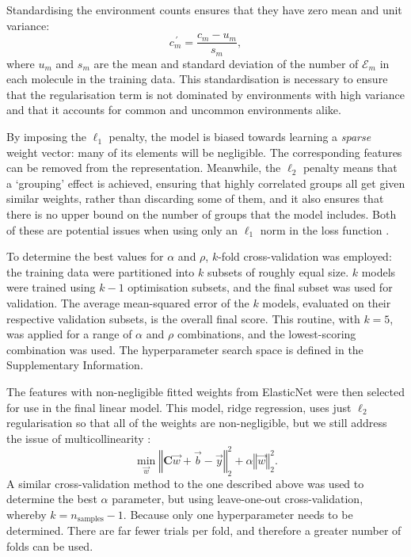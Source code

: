 Standardising the environment counts ensures that they have zero mean and unit variance:
\begin{equation}
    \label{eq:standard-scaling}
    {c}^{\,\prime}_m = \frac{c_m - u_m}{s_m},
\end{equation}
where $u_m$ and $s_m$ are the mean and standard deviation of the number of $\mathcal{E}_m$ in each molecule in the training data. This standardisation is necessary to ensure that the regularisation term is not dominated by
environments with high variance and that it accounts for common and uncommon environments alike.

By imposing the $\ell_1$ penalty, the model is biased towards learning a
\emph{sparse} weight vector: many of its elements will be negligible. The
corresponding features can be removed from the representation. Meanwhile, the
$\ell_2$ penalty means that a `grouping' effect is achieved, ensuring that
highly correlated groups all get given similar weights, rather than discarding
some of them, and it also ensures that there is no upper bound on the number of
groups that the model includes. Both of these are potential issues when using
only an $\ell_1$ norm in the loss function
\cite{efronLeastAngleRegression2004,zouRegularizationVariableSelection2005}.


To determine the best values for $\alpha$ and $\rho$, $k$-fold cross-validation was employed: the training data were partitioned into $k$ subsets of roughly equal size. $k$ models were trained using $k-1$ optimisation subsets, and the final subset was used for
validation. The average mean-squared error of the $k$ models, evaluated on their respective validation subsets, is the overall final score. This routine, with $k=5$, was applied for a range of $\alpha$ and $\rho$ combinations, and the
lowest-scoring combination was used. The hyperparameter search space is defined in the Supplementary Information.

The features with non-negligible fitted weights from ElasticNet were then selected for use in the final linear model. This model, ridge regression, uses just $\ell_2$ regularisation so that all of the weights are non-negligible, but we
still address the issue of multicollinearity \cite{mcdonaldRidgeRegression2009}:
\begin{equation}
    \min_{\vec{w}} \left \Vert \mathbf{C} \vec{w} + \vec{b} - \vec{y} \right \Vert_2^2 + \alpha \left \Vert \vec{w}\right \Vert_2^2.
\end{equation}
A similar cross-validation method to the one described above was used to determine the best $\alpha$ parameter, but using leave-one-out cross-validation, whereby $k=n_\text{samples}-1$. Because only one hyperparameter needs to be determined. There are far fewer trials per
fold, and therefore a greater number of folds can be used.

